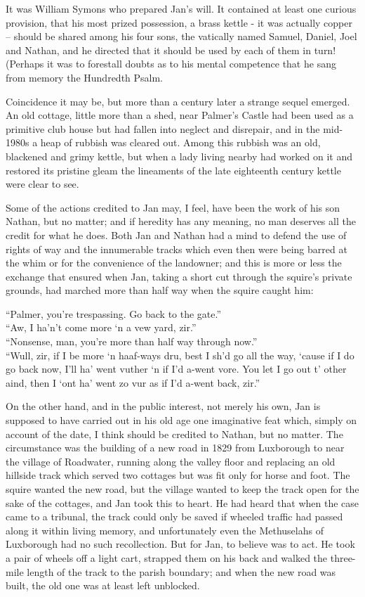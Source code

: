 It was William Symons who prepared Jan's will. It contained at least one curious provision, that his most prized possession, a brass kettle - it was actually copper – should be shared among his four sons, the vatically named Samuel, Daniel, Joel and Nathan, and he directed that it should be used by each of them in turn! (Perhaps it was to forestall doubts as to his mental competence that he sang from memory the Hundredth Psalm.

Coincidence it may be, but more than a century later a strange sequel emerged. An old cottage, little more than a shed, near Palmer’s Castle had been used as a primitive club house but had fallen into neglect and disrepair, and in the mid-1980s a heap of rubbish was cleared out. Among this rubbish was an old, blackened and grimy kettle, but when a lady living nearby had worked on it and restored its pristine gleam the lineaments of the late eighteenth century kettle were clear to see.

Some of the actions credited to Jan may, I feel, have been the work of his son Nathan, but no matter; and if heredity has any meaning, no man deserves all the credit for what he does. Both Jan and Nathan had a mind to defend the use of rights of way and the innumerable tracks which even then were being barred at the whim or for the convenience of the landowner; and this is more or less the exchange that ensured when Jan, taking a short cut through the squire’s private grounds, had marched more than half way when the squire caught him:

“Palmer, you’re trespassing. Go back to the gate.”\\
 “Aw, I ha’n’t come more ‘n a vew yard, zir.”\\
 “Nonsense, man, you’re more than half way through now.”\\
 “Wull, zir, if I be more ‘n haaf-ways dru, best I sh’d go all the way, ‘cause if I do go back now, I’ll ha’ went vuther ‘n if I’d a-went vore. You let I go out t’ other aind, then I ‘ont ha’ went zo vur as if I’d a-went back, zir.”
 

On the other hand, and in the public interest, not merely his own, Jan is supposed to have carried out in his old age one imaginative feat which, simply on account of the date, I think should be credited to Nathan, but no matter. The circumstance was the building of a new road in 1829 from Luxborough to near the village of Roadwater, running along the valley floor and replacing an old hillside track which served two cottages but was fit only for horse and foot. The squire wanted the new road, but the village wanted to keep the track open for the sake of the cottages, and Jan took this to heart. He had heard that when the case came to a tribunal, the track could only be saved if wheeled traffic had passed along it within living memory, and unfortunately even the Methuselahs of Luxborough had no such recollection. But for Jan, to believe was to act. He took a pair of wheels off a light cart, strapped them on his back and walked the three-mile length of the track to the parish boundary; and when the new road was built, the old one was at least left unblocked. 	

